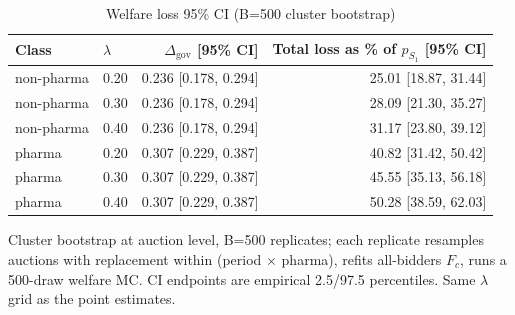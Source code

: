 \begin{table}[htbp]
\centering
\begin{threeparttable}
\caption{Welfare loss 95\% CI (B=500 cluster bootstrap)}
\label{tab:v3_welfare_ci}
\small
\begin{tabular}{llrr}
\toprule
Class & $\lambda$ & $\Delta_{\text{gov}}$ [95\% CI] & Total loss as \% of $p_{S_1}$ [95\% CI] \\
\midrule
non-pharma & 0.20 & 0.236 [0.178, 0.294] & 25.01 [18.87, 31.44] \\
non-pharma & 0.30 & 0.236 [0.178, 0.294] & 28.09 [21.30, 35.27] \\
non-pharma & 0.40 & 0.236 [0.178, 0.294] & 31.17 [23.80, 39.12] \\
pharma & 0.20 & 0.307 [0.229, 0.387] & 40.82 [31.42, 50.42] \\
pharma & 0.30 & 0.307 [0.229, 0.387] & 45.55 [35.13, 56.18] \\
pharma & 0.40 & 0.307 [0.229, 0.387] & 50.28 [38.59, 62.03] \\
\bottomrule
\end{tabular}
\begin{tablenotes}\footnotesize
\item Cluster bootstrap at auction level, B=500 replicates;
each replicate resamples auctions with replacement within
(period $\times$ pharma), refits all-bidders $F_c$, runs a
500-draw welfare MC. CI endpoints are empirical 2.5/97.5
percentiles. Same $\lambda$ grid as the point estimates.
\end{tablenotes}
\end{threeparttable}
\end{table}
